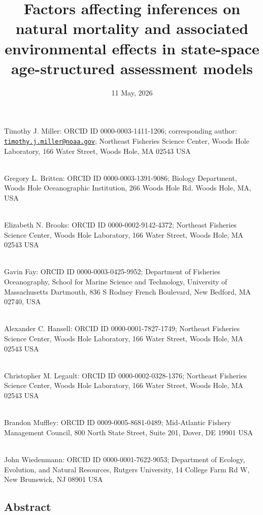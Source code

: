 \documentclass[
  12pt,
]{article}
\title{Factors affecting inferences on natural mortality and associated
environmental effects in state-space age-structured assessment models}
\author{}
\date{\vspace{-2.5em}11 May, 2026}
\begin{document}
\maketitle

Timothy J. Miller: ORCID ID 0000-0003-1411-1206; corresponding author:
\href{mailto:timothy.j.miller@noaa.gov}{\nolinkurl{timothy.j.miller@noaa.gov}};
Northeast Fisheries Science Center, Woods Hole Laboratory, 166 Water
Street, Woods Hole, MA 02543 USA\\
\strut \\
Gregory L. Britten: ORCID ID 0000-0003-1391-9086; Biology Department,
Woods Hole Oceanographic Institution, 266 Woods Hole Rd. Woods Hole, MA,
USA\\
\strut \\
Elizabeth N. Brooks: ORCID ID 0000-0002-9142-4372; Northeast Fisheries
Science Center, Woods Hole Laboratory, 166 Water Street, Woods Hole, MA
02543 USA\\
\strut \\
Gavin Fay: ORCID ID 0000-0003-0425-9952; Department of Fisheries
Oceanography, School for Marine Science and Technology, University of
Massachusetts Dartmouth, 836 S Rodney French Boulevard, New Bedford, MA
02740, USA\\
\strut \\
Alexander C. Hansell: ORCID ID 0000-0001-7827-1749; Northeast Fisheries
Science Center, Woods Hole Laboratory, 166 Water Street, Woods Hole, MA
02543 USA\\
\strut \\
Christopher M. Legault: ORCID ID 0000-0002-0328-1376; Northeast
Fisheries Science Center, Woods Hole Laboratory, 166 Water Street, Woods
Hole, MA 02543 USA\\
\strut \\
Brandon Muffley: ORCID ID 0009-0005-8681-0489; Mid-Atlantic Fishery
Management Council, 800 North State Street, Suite 201, Dover, DE 19901
USA\\
\strut \\
John Wiedenmann: ORCID ID 0000-0001-7622-9053; Department of Ecology,
Evolution, and Natural Resources, Rutgers University, 14 College Farm Rd
W, New Brunswick, NJ 08901 USA\\

\pagebreak

\subsection*{Abstract}\label{abstract}
\end{document}
